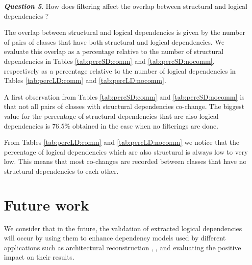 \documentclass[a4paper,twoside]{article}
\begin{document}


\textit{\textbf{Question 5}}. How does filtering affect the overlap between structural and logical dependencies ? 

The overlap between structural and logical dependencies is given by the number of pairs of classes that have both structural and logical dependencies. We evaluate this overlap as a percentage relative to the number of structural dependencies in Tables \ref{tab:percSD:comm} and \ref{tab:percSD:nocomm}, respectively as  a percentage relative to the number of logical dependencies in Tables \ref{tab:percLD:comm} and \ref{tab:percLD:nocomm}.

A first observation from Tables \ref{tab:percSD:comm} and \ref{tab:percSD:nocomm} is that not all pairs of classes with structural dependencies co-change. The biggest value for the percentage of structural dependencies that are also logical dependencies is 76.5\% obtained in the case when no filterings are done.

From Tables \ref{tab:percLD:comm} and \ref{tab:percLD:nocomm} we notice that the percentage of logical dependencies which are also structural is always low to very low. This means that most co-changes are recorded between classes that have no structural dependencies to each other.   
 

\section {Future work}
\label{sec:futurework}

We consider that in the future, the validation of extracted logical dependencies will occur by using them to enhance dependency models used by different applications such as architectural reconstruction \cite{SoraConti}, \cite{PagerankENASE}, and evaluating the positive impact on their results.   
\end{document}
